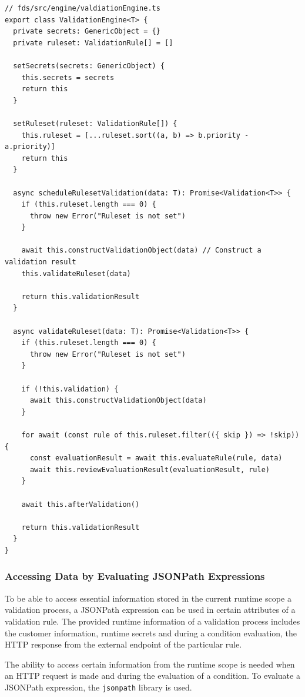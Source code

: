       \begin{lstlisting}[style=es6, caption={ValidationEngine class and the scheduleRulesetValidation method (TypeScript)}]
// fds/src/engine/valdiationEngine.ts
export class ValidationEngine<T> {
  private secrets: GenericObject = {}
  private ruleset: ValidationRule[] = []

  setSecrets(secrets: GenericObject) {
    this.secrets = secrets
    return this
  }

  setRuleset(ruleset: ValidationRule[]) {
    this.ruleset = [...ruleset.sort((a, b) => b.priority - a.priority)]
    return this
  }

  async scheduleRulesetValidation(data: T): Promise<Validation<T>> {
    if (this.ruleset.length === 0) {
      throw new Error("Ruleset is not set")
    }

    await this.constructValidationObject(data) // Construct a validation result
    this.validateRuleset(data)

    return this.validationResult
  }

  async validateRuleset(data: T): Promise<Validation<T>> {
    if (this.ruleset.length === 0) {
      throw new Error("Ruleset is not set")
    }

    if (!this.validation) {
      await this.constructValidationObject(data)
    }

    for await (const rule of this.ruleset.filter(({ skip }) => !skip)) {
      const evaluationResult = await this.evaluateRule(rule, data)
      await this.reviewEvaluationResult(evaluationResult, rule)
    }

    await this.afterValidation()

    return this.validationResult
  }
}
      \end{lstlisting}

    \subsubsection{Accessing Data by Evaluating JSONPath Expressions}
      
      To be able to access essential information stored in the current runtime scope a validation process, a JSONPath expression can be used in certain attributes of a validation rule. The provided runtime information of a validation process includes the customer information, runtime secrets and during a condition evaluation, the HTTP response from the external endpoint of the particular rule. 

      The ability to access certain information from the runtime scope is needed when an HTTP request is made and during the evaluation of a condition. To evaluate a JSONPath expression, the \verb;jsonpath; library is used. 

